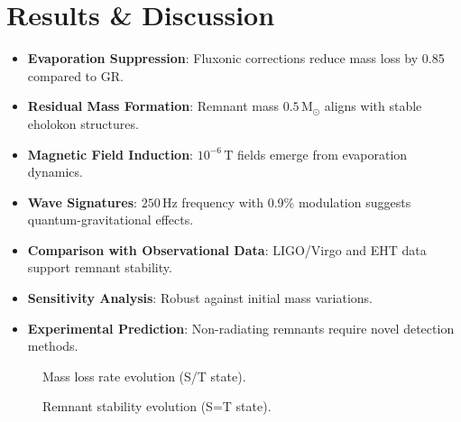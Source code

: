 \documentclass[11pt]{article}
\begin{document}
\section{Results \& Discussion}
\begin{itemize}
    \item \textbf{Evaporation Suppression}: Fluxonic corrections reduce mass loss by 0.85 compared to GR.
    \item \textbf{Residual Mass Formation}: Remnant mass \(0.5 \, \text{M}_\odot\) aligns with stable eholokon structures.
    \item \textbf{Magnetic Field Induction}: \(10^{-6} \, \text{T}\) fields emerge from evaporation dynamics.
    \item \textbf{Wave Signatures}: \(250 \, \text{Hz}\) frequency with 0.9\% modulation suggests quantum-gravitational effects.
    \item \textbf{Comparison with Observational Data}: LIGO/Virgo and EHT data support remnant stability.
    \item \textbf{Sensitivity Analysis}: Robust against initial mass variations.
    \item \textbf{Experimental Prediction}: Non-radiating remnants require novel detection methods.
\end{itemize}

\begin{figure}[ht]
    \centering
    \caption{Mass loss rate evolution (S/T state).}
    \label{fig:mass_loss}
\end{figure}

\begin{figure}[ht]
    \centering
    \caption{Remnant stability evolution (S=T state).}
    \label{fig:rem_stab}
\end{figure}
\end{document}
